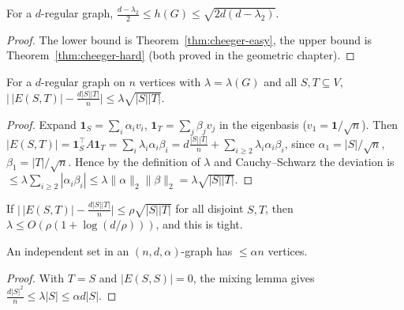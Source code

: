 \begin{theorem}
  \label{thm:cheeger}
  For a $d$-regular graph,
  $\frac{d-\lambda_2}2\le h(G)\le\sqrt{2d(d-\lambda_2)}$.
\end{theorem}
\begin{proof}
  The lower bound is Theorem~\ref{thm:cheeger-easy}, the upper bound is
  Theorem~\ref{thm:cheeger-hard} (both proved in the geometric chapter).
\end{proof}

\begin{lemma}
  \label{lem:expander-mixing}
  For a $d$-regular graph on $n$ vertices with $\lambda=\lambda(G)$ and all
  $S,T\subseteq V$,
  $\bigl|\,|E(S,T)|-\frac{d|S||T|}n\bigr|\le\lambda\sqrt{|S||T|}$.
\end{lemma}
\begin{proof}
  Expand $\mathbf 1_S=\sum_i\alpha_iv_i$, $\mathbf 1_T=\sum_j\beta_jv_j$ in the
  eigenbasis ($v_1=\mathbf 1/\sqrt n$). Then
  $|E(S,T)|=\mathbf 1_S^\top A\mathbf 1_T=\sum_i\lambda_i\alpha_i\beta_i
  =d\tfrac{|S||T|}n+\sum_{i\ge2}\lambda_i\alpha_i\beta_i$, since
  $\alpha_1=|S|/\sqrt n$, $\beta_1=|T|/\sqrt n$. Hence by the definition of
  $\lambda$ and Cauchy--Schwarz the deviation is
  $\le\lambda\sum_{i\ge2}|\alpha_i\beta_i|\le\lambda\|\alpha\|_2\|\beta\|_2
  =\lambda\sqrt{|S||T|}$.
\end{proof}

\begin{lemma}
  \label{lem:mixing-converse}
  \notready
  If $\bigl|\,|E(S,T)|-\tfrac{d|S||T|}n\bigr|\le\rho\sqrt{|S||T|}$ for all
  disjoint $S,T$, then $\lambda\le O(\rho(1+\log(d/\rho)))$, and this is tight.
\end{lemma}

\begin{corollary}
  \label{cor:independent-set}
  An independent set in an $(n,d,\alpha)$-graph has $\le\alpha n$ vertices.
\end{corollary}
\begin{proof}
  With $T=S$ and $|E(S,S)|=0$, the mixing lemma gives
  $\tfrac{d|S|^2}n\le\lambda|S|\le\alpha d|S|$.
\end{proof}


